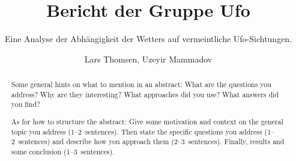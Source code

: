 \title{Bericht der Gruppe \glqq Ufo\glqq}
\subtitle{Eine Analyse der Abhängigkeit der Wetters auf vermeintliche Ufo-Sichtungen.}         %


\author{Lars Thomsen, Uzeyir Mammadov}

\begin{abstract}
 Some general hints on what to mention in an abstract: What are the questions you address? Why are they interesting? What approaches did you use? What answers did you find?
 
 As for how to structure the abstract: Give some motivation and context on the general topic you address (1--2~sentences). Then state the specific questions you address (1--2~sentences) and describe how you approach them (2--3~sentences). Finally, results and some conclusion (1--3~sentences).
\end{abstract}

\maketitle
